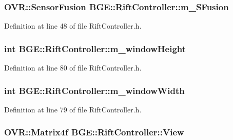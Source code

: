 \hypertarget{class_b_g_e_1_1_rift_controller_a5b1eadfb98b420bd3ea0f116cc55a6fd}{
\subsubsection[{m\-\_\-\-S\-Fusion}]{\setlength{\rightskip}{0pt plus 5cm}O\-V\-R\-::\-Sensor\-Fusion B\-G\-E\-::\-Rift\-Controller\-::m\-\_\-\-S\-Fusion}}\label{class_b_g_e_1_1_rift_controller_a5b1eadfb98b420bd3ea0f116cc55a6fd}


Definition at line 48 of file Rift\-Controller.\-h.

\hypertarget{class_b_g_e_1_1_rift_controller_ae4d2d0702bd52b47c5374d36c4b860e4}{
\subsubsection[{m\-\_\-window\-Height}]{\setlength{\rightskip}{0pt plus 5cm}int B\-G\-E\-::\-Rift\-Controller\-::m\-\_\-window\-Height}}\label{class_b_g_e_1_1_rift_controller_ae4d2d0702bd52b47c5374d36c4b860e4}


Definition at line 80 of file Rift\-Controller.\-h.

\hypertarget{class_b_g_e_1_1_rift_controller_a4148f05449ea0ad8abb4fc1b6e06cc10}{
\subsubsection[{m\-\_\-window\-Width}]{\setlength{\rightskip}{0pt plus 5cm}int B\-G\-E\-::\-Rift\-Controller\-::m\-\_\-window\-Width}}\label{class_b_g_e_1_1_rift_controller_a4148f05449ea0ad8abb4fc1b6e06cc10}


Definition at line 79 of file Rift\-Controller.\-h.

\hypertarget{class_b_g_e_1_1_rift_controller_a928de952c8f9d78d6c60dcd51e4caab9}{
\subsubsection[{View}]{\setlength{\rightskip}{0pt plus 5cm}O\-V\-R\-::\-Matrix4f B\-G\-E\-::\-Rift\-Controller\-::\-View}}\label{class_b_g_e_1_1_rift_controller_a928de952c8f9d78d6c60dcd51e4caab9}


